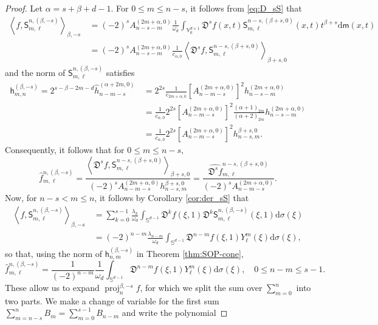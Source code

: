 \documentclass{amsart}
\theoremstyle{remark}
\def\d{\mathrm{d}}
\def\sph{{\mathbb{S}^{d-1}}}
\def\sh{{\mathsf h}}
\def\sm{{\mathsf m}}
\def\sS{{\mathsf S}}
\def\fD{{\mathfrak D}}
\def\a{{\alpha}}
\def\b{{\beta}}
\def\l{{\lambda}}
\def\o{{\omega}}
\def\s{\sigma}
\def\VV{{\mathbb V}}
\def\proj{\operatorname{proj}}
\newcommand{\wh}{\widehat}
\begin{document}
\begin{proof}
Let $\a = s+\b+d-1$. For $0 \le m \le n-s$, it follows from \eqref{eq:D_sS} that
\begin{align*}
\left \langle f,  \sS_{m, \ell}^{n,(\b,-s)}\right \rangle_{\b,-s} \,&  =(-2)^s A_{n-s-m}^{(2m+\a,0)}
   \frac{1}{\o_d} \int_{\VV_0^{d+1}} \fD^s f(x,t) \sS_{m,\ell}^{n-s,(\b+s,0)}(x,t) t^{\b+s} \d \sm(x,t)\\
         & = (-2)^s A_{n-s-m}^{(2m+\a,0)} \frac{1}{c_{\a,0}}
           \left \langle \fD^s f,  \sS_{m, \ell}^{n-s,(\b+s,0)}\right \rangle_{\b+s,0}
\end{align*}
and the norm of $\sS_{m,\ell}^{n,(\b,-s)}$ satisfies
\begin{align*}
  \sh_{m,n}^{(\b,-s)} = 2^{s - \b-2m-d} \wh h_{n-m-s}^{(\a+2m,0)} \, & =
   2^{2s}  \frac{1}{c_{2m+\a,0}} \left[A_{n-m-s}^{(2m+\a,0)}\right]^2 h_{n-s-m}^{(2m+\a,0)} \\
  & = \frac{1}{c_{\a,0}} 2^{2s} \left[A_{n-m-s}^{(2m+\a,0)}\right]^2 \frac{(\a+1)_{2m}}{(\a+2)_{2m}}h_{n-s-m}^{(2m+\a,0)}\\
  & =  \frac{1}{c_{\a,0}} 2^{2s} \left[A_{n-m-s}^{(2m+\a,0)}\right]^2 h_{n-s, m}^{\b+s,0}.
\end{align*}
Consequently, it follows that for $0 \le m \le n-s$,
\begin{equation}\label{eq:FourierCoeffs}
 \hat f_{m,\ell}^{n, (\b,-s)} = \frac{ \left \langle \fD^s f,  \sS_{m, \ell}^{n-s,(\b+s,0)}\right \rangle_{\b+s,0}}
       { (-2)^{s} A_{n-m-s}^{(2m+\a,0)} h_{n-s, m}^{\b+s,0}}
        = \frac{ \wh{\fD^s f}_{m,\ell}^{n-s, (\b+s,0)}}{(-2)^{s} A_{n-m-s}^{(2m+\a,0)}}.
\end{equation}
Now, for $n-s < m \le n$, it follows by Corollary \ref{cor:der_sS} that
\begin{align*}
\left \langle f, \sS_{m, \ell}^{n,(\b,-s)}\right \rangle_{\b,-s}
\,& = \sum_{k=0}^{s-1} \frac{\l_k}{\o_d} \int_{\sph} \fD^k f(\xi,1) \fD^k  \sS_{m, \ell}^{n,(\b,-s)}(\xi,1)\d \s(\xi) \\
 & = (-2)^{n-m} \frac{\l_{n-m}}{\o_d} \int_{\sph}\fD^{n-m} f(\xi,1) Y_\ell^{m} (\xi)\d \s(\xi),
\end{align*}
so that, using the norm of $\sh_{n,m}^{(\b,-s)}$ in Theorem \ref{thm:SOP-cone},
$$
\hat f_{m,\ell}^{n, (\b,-s)} = \frac{1}{(-2)^{n-m}} \frac{1}{\o_d} \int_{\sph} \fD^{n-m} f(\xi,1) Y_\ell^{m} (\xi)\d \s(\xi),
   \quad 0\le n-m \le s-1.
$$
These allow us to expand $\proj_n^{\b,-s} f$, for which we split the sum over $\sum_{m=0}^n$ into two parts. We make 
a change of variable for the first sum $\sum_{m=n-s}^n B_m = \sum_{m=0}^{s-1} B_{n-m}$ and write the polynomial 

\end{proof}
\end{document}
